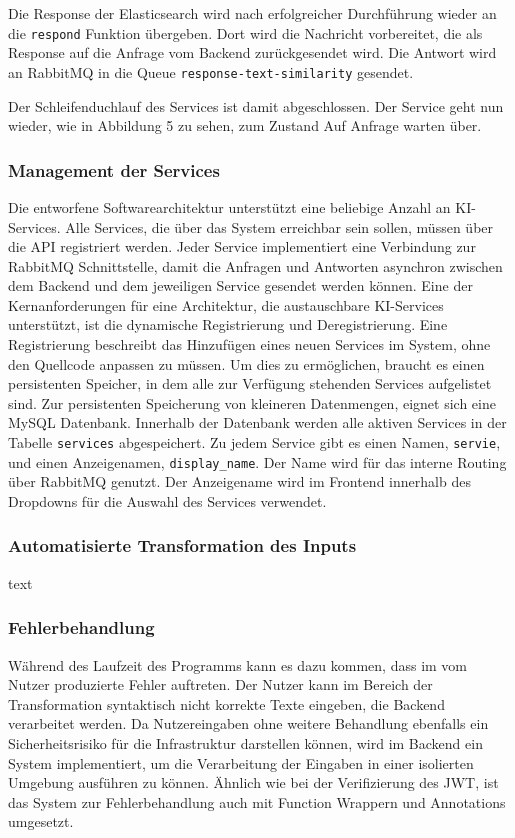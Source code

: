 Die Response der Elasticsearch wird nach erfolgreicher Durchführung wieder an die \texttt{respond} Funktion übergeben. Dort wird die Nachricht vorbereitet, die als Response auf die Anfrage vom Backend zurückgesendet wird. Die Antwort wird an RabbitMQ in die Queue \texttt{response-text-similarity} gesendet.

Der Schleifenduchlauf des Services ist damit abgeschlossen. Der Service geht nun wieder, wie in Abbildung 5 zu sehen, zum Zustand \glqq Auf Anfrage warten\grqq{} über. 

\subsubsection{Management der Services}
Die entworfene Softwarearchitektur unterstützt eine beliebige Anzahl an KI-Services. Alle Services, die über das System erreichbar sein sollen, müssen über die API registriert werden. Jeder Service implementiert eine Verbindung zur RabbitMQ Schnittstelle, damit die Anfragen und Antworten asynchron zwischen dem Backend und dem jeweiligen Service gesendet werden können. Eine der Kernanforderungen für eine Architektur, die austauschbare KI-Services unterstützt, ist die dynamische Registrierung und Deregistrierung. Eine Registrierung beschreibt das Hinzufügen eines neuen Services im System, ohne den Quellcode anpassen zu müssen. Um dies zu ermöglichen, braucht es einen persistenten Speicher, in dem alle zur Verfügung stehenden Services aufgelistet sind. Zur persistenten Speicherung von kleineren Datenmengen, eignet sich eine MySQL Datenbank. Innerhalb der Datenbank werden alle aktiven Services in der Tabelle \texttt{services} abgespeichert. Zu jedem Service gibt es einen Namen, \texttt{servie}, und einen Anzeigenamen, \texttt{display\_{}name}. Der Name wird für das interne Routing über RabbitMQ genutzt. Der Anzeigename wird im Frontend innerhalb des Dropdowns für die Auswahl des Services verwendet.

\subsubsection{Automatisierte Transformation des Inputs}
text

\subsubsection{Fehlerbehandlung}
Während des Laufzeit des Programms kann es dazu kommen, dass im vom Nutzer produzierte Fehler auftreten. Der Nutzer kann im Bereich der Transformation syntaktisch nicht korrekte Texte eingeben, die Backend verarbeitet werden. Da Nutzereingaben ohne weitere Behandlung ebenfalls ein Sicherheitsrisiko für die Infrastruktur darstellen können, wird im Backend ein System implementiert, um die Verarbeitung der Eingaben in einer isolierten Umgebung ausführen zu können. Ähnlich wie bei der Verifizierung des JWT, ist das System zur Fehlerbehandlung auch mit Function Wrappern und Annotations umgesetzt. 

